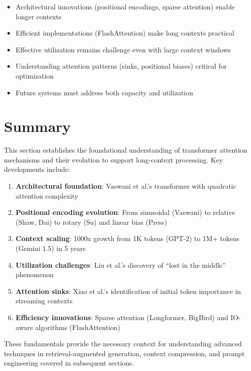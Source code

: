 \documentclass[11pt,letterpaper]{article}
\begin{document}
\begin{itemize}[leftmargin=*]
    \item Architectural innovations (positional encodings, sparse attention) enable longer contexts
    \item Efficient implementations (FlashAttention) make long contexts practical
    \item Effective utilization remains challenge even with large context windows
    \item Understanding attention patterns (sinks, positional biases) critical for optimization
    \item Future systems must address both capacity and utilization
\end{itemize}

\section{Summary}

This section establishes the foundational understanding of transformer attention mechanisms and their evolution to support long-context processing. Key developments include:

\begin{enumerate}[leftmargin=*]
    \item \textbf{Architectural foundation}: Vaswani et al.'s transformer with quadratic attention complexity
    \item \textbf{Positional encoding evolution}: From sinusoidal (Vaswani) to relative (Shaw, Dai) to rotary (Su) and linear bias (Press)
    \item \textbf{Context scaling}: 1000x growth from 1K tokens (GPT-2) to 1M+ tokens (Gemini 1.5) in 5 years
    \item \textbf{Utilization challenges}: Liu et al.'s discovery of ``lost in the middle'' phenomenon
    \item \textbf{Attention sinks}: Xiao et al.'s identification of initial token importance in streaming contexts
    \item \textbf{Efficiency innovations}: Sparse attention (Longformer, BigBird) and IO-aware algorithms (FlashAttention)
\end{enumerate}

These fundamentals provide the necessary context for understanding advanced techniques in retrieval-augmented generation, context compression, and prompt engineering covered in subsequent sections.
\end{document}
